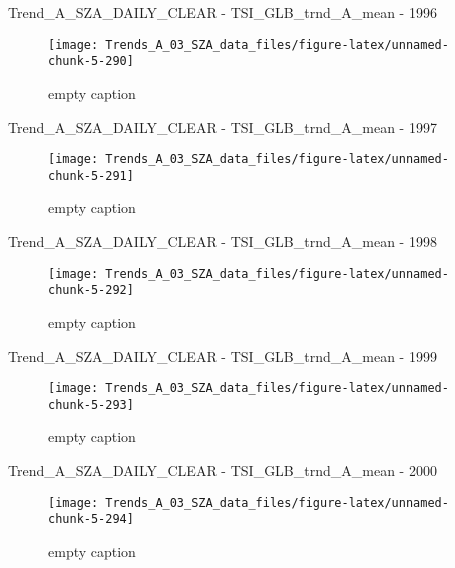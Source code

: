 \documentclass[
  10pt,
  a4paper,oneside]{article}
\begin{document}
Trend\_A\_SZA\_DAILY\_CLEAR - TSI\_GLB\_trnd\_A\_mean - 1996

\begin{figure}[!ht]

{\centering \texttt{[image: Trends\_A\_03\_SZA\_data\_files/figure-latex/unnamed-chunk-5-290]} 

}

\caption{ empty caption }\label{fig:unnamed-chunk-5-290}
\end{figure}

Trend\_A\_SZA\_DAILY\_CLEAR - TSI\_GLB\_trnd\_A\_mean - 1997

\begin{figure}[!ht]

{\centering \texttt{[image: Trends\_A\_03\_SZA\_data\_files/figure-latex/unnamed-chunk-5-291]} 

}

\caption{ empty caption }\label{fig:unnamed-chunk-5-291}
\end{figure}

Trend\_A\_SZA\_DAILY\_CLEAR - TSI\_GLB\_trnd\_A\_mean - 1998

\begin{figure}[!ht]

{\centering \texttt{[image: Trends\_A\_03\_SZA\_data\_files/figure-latex/unnamed-chunk-5-292]} 

}

\caption{ empty caption }\label{fig:unnamed-chunk-5-292}
\end{figure}

Trend\_A\_SZA\_DAILY\_CLEAR - TSI\_GLB\_trnd\_A\_mean - 1999

\begin{figure}[!ht]

{\centering \texttt{[image: Trends\_A\_03\_SZA\_data\_files/figure-latex/unnamed-chunk-5-293]} 

}

\caption{ empty caption }\label{fig:unnamed-chunk-5-293}
\end{figure}

Trend\_A\_SZA\_DAILY\_CLEAR - TSI\_GLB\_trnd\_A\_mean - 2000

\begin{figure}[!ht]

{\centering \texttt{[image: Trends\_A\_03\_SZA\_data\_files/figure-latex/unnamed-chunk-5-294]} 

}

\caption{ empty caption }\label{fig:unnamed-chunk-5-294}
\end{figure}
\end{document}
